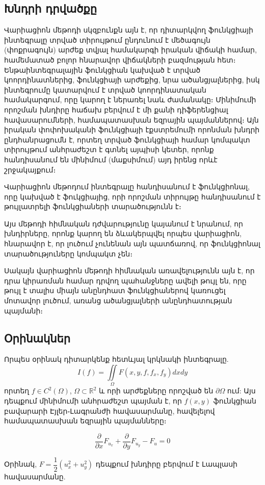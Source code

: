 \documentclass[fleqn, bachelor,subf,12pt,notitlepage]{article}
\begin{document}
\subsection*{Խնդրի դրվածքը}
\hspace{\parindent}Վարիացիոն մեթոդի սկզբունքն այն է, որ դիտարկվող ֆունկցիայի ինտեգրալը տրված տիրույթում ընդունում է մեծագույն (փոքրագույն) արժեք տվյալ համակարգի իրական վիճակի համար, համեմատած բոլոր հնարավոր վիճակների բազմության հետ։  Ենթաինտեգրալային ֆունկցիան կախված է տրված կոորդինատներից, ֆունկցիայի արժեքից, նրա ածանցյալներից, իսկ ինտեգրումը կատարվում է տրված կոորդինատական համակարգում, որը կարող է ներառել նաև ժամանակը։ Մինիմումի որոշման խնդիրը հաճախ բերվում է մի քանի դիֆերենցիալ հավասարումների, համապատասխան եզրային պայմաններով։  Այն իրական փոփոխականի ֆունկցիայի էքստրեմումի որոնման խնդրի ընդհանրացումն է, որտեղ տրված ֆունկցիայի համար կոմպակտ տիրույթում անհրաժեշտ է գտնել այպիսի կետեր, որոնք հանդիսանում են մինիմում (մաքսիմում) այդ իրենց որևէ շրջակայքում։

Վարիացիոն մեթոդում ինտեգրալը հանդիսանում է ֆունկցիոնալ, որը կախված է ֆուկցիայից, որի որոշման տիրույթը հանդիսանում է թույլատրելի ֆունկցիաների  տարածությունն է։ 

Այս  մեթոդի հիմնական դժվարությունը կայանում է նրանում, որ խնդիրները, որոնք կարող են ձևակերպվել որպես վարիացիոն, հնարավոր է, որ լուծում չունենան այն պատճառով, որ ֆունկցիոնալ տարածություները  կոմպակտ չեն։

Սակայն վարիացիոն մեթոդի հիմնական առավելությունն այն է, որ դրա կիրառման համար դրվող պահանջները ավելի թույլ են, որը թույլ է տալիս միայն անընդհատ \newpage ֆունկցիաներով կառուցել մոտավոր լուծում, առանց ածանցյալների անընդհատության պայմանի։
\newpage
\subsection*{Օրինակներ}
\hspace{\parindent}Որպես օրինակ դիտարկենք հետևյալ կրկնակի ինտեգրալը.
$$I\left(f\right)=\iint \limits_{\Omega} F\left(x, y, f, f_{x}, f_{y}\right)dxdy$$
որտեղ $f \in C^{2}(\Omega)$,  $\Omega\subset \mathbb{R}^{2}$ և որի արժեքները որոշված են $\partial \Omega$ ում:
Այս դեպքում մինիմումի անհրաժեշտ պայման է, որ $f(x,y)$ ֆունկցիան բավարարի Էյլեր֊Լագրանժի հավասարմանը, հավելելով համապատասխան եզրային պայմանները։

$$\dfrac{\partial}{\partial x}F_{u_{x}} + \dfrac{\partial}{\partial y}F_{u_{y}} - F_{u} = 0$$

\noindent Օրինակ, $F = \dfrac{1}{2}\left(u_{x}^2+u_{y}^2\right)$ դեպքում խնդիրը բերվում է Լապլասի հավասարմանը.
\end{document}
